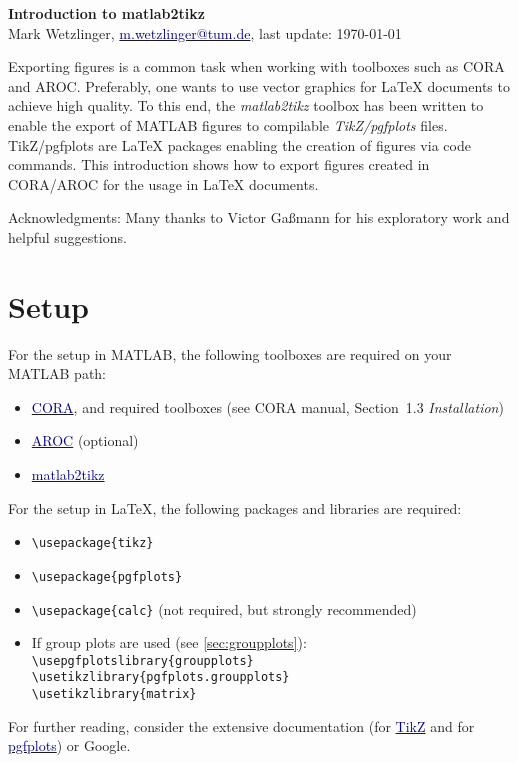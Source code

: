 \documentclass{article}
\newcommand{\linkto}[2]{\href{#1}{\textcolor{darkblue}{#2}}}
\begin{document}
\begin{center}
\huge
\textbf{Introduction to matlab2tikz} \\
\smallskip \small
Mark Wetzlinger, \linkto{mailto:m.wetzlinger@tum.de}{m.wetzlinger@tum.de}, last update: \today
\end{center}

\bigskip

Exporting figures is a common task when working with toolboxes such as CORA and AROC.
Preferably, one wants to use vector graphics for LaTeX documents to achieve high quality.
To this end, the \emph{matlab2tikz} toolbox has been written to enable the export of MATLAB figures to compilable \emph{TikZ/pgfplots} files.
TikZ/pgfplots are LaTeX packages enabling the creation of figures via code commands.
This introduction shows how to export figures created in CORA/AROC for the usage in LaTeX documents.

Acknowledgments: Many thanks to Victor Ga{\ss}mann for his exploratory work and helpful suggestions.

\section{Setup}
\label{sec:setup}

For the setup in MATLAB, the following toolboxes are required on your MATLAB path:
%
\begin{itemize}[itemsep=0pt]
	\item \linkto{https://tumcps.github.io/CORA/}{CORA}, and required toolboxes (see CORA manual, Section~1.3 \emph{Installation})
	\item \linkto{https://tumcps.github.io/AROC/}{AROC} (optional)
	\item \linkto{https://github.com/matlab2tikz/matlab2tikz}{matlab2tikz}
\end{itemize}
%
For the setup in LaTeX, the following packages and libraries are required:
%
\begin{itemize}[itemsep=0pt]
	\item \verb|\usepackage{tikz}|
	\item \verb|\usepackage{pgfplots}|
	\item \verb|\usepackage{calc}| (not required, but strongly recommended)
	\item If group plots are used (see \cref{sec:groupplots}): \\
			\verb|\usepgfplotslibrary{groupplots}| \\
			\verb|\usetikzlibrary{pgfplots.groupplots}| \\
			\verb|\usetikzlibrary{matrix}|
\end{itemize}
%
For further reading, consider the extensive documentation (for \linkto{https://ctan.ebinger.cc/tex-archive/graphics/pgf/base/doc/pgfmanual.pdf}{TikZ} and for \linkto{https://ctan.space-pro.be/tex-archive/graphics/pgf/contrib/pgfplots/doc/pgfplots.pdf}{pgfplots}) or Google.
\end{document}
